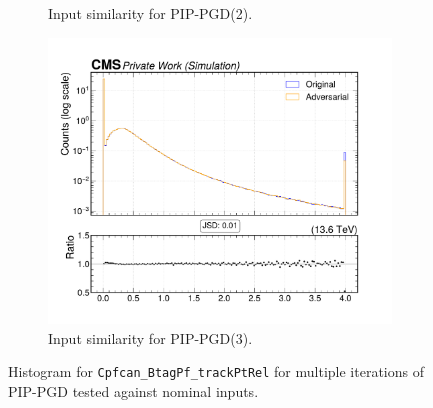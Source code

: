 \begin{figure}[htbp]
\begin{subfigure}[t]{0.32\textwidth}
    \caption*{Input similarity for PIP-PGD(2).}
  \end{subfigure}\hfill
  \begin{subfigure}[t]{0.32\textwidth}
    \includegraphics[width=\linewidth]{media/output/features/compare/combined_it_3/cmp_cpf_arr_Cpfcan_BtagPf_trackPtRel.pdf}
    \caption*{Input similarity for PIP-PGD(3).}
  \end{subfigure}

  \caption*{Histogram for \texttt{Cpfcan\_BtagPf\_trackPtRel} for multiple iterations of PIP-PGD tested against nominal inputs.}
  \label{fig:combined_input_Cpfcan_BtagPf_trackPtRel}
\end{figure}

